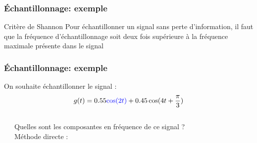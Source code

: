 \documentclass{beamer}
\begin{document}
\begin{frame} 
\frametitle{\'Echantillonnage: exemple}
\begin{block}{Critère de Shannon}
Pour échantillonner un signal sans perte d'information, il faut que la fréquence d'échantillonnage soit deux fois supérieure à la fréquence maximale présente dans le signal
\end{block}


\end{frame}

\begin{frame}
\frametitle{\'Echantillonnage: exemple}
On souhaite échantillonner le signal : $$g(t) = 0.55{\color{blue}\cos(2 t)} + 0.45 \cos(4 t + \frac{\pi}{3}) $$
\begin{columns}[T]
\column{60 mm}
\begin{center}
\end{center}

\column{60 mm}

Quelles sont les composantes en fréquence de ce signal ?\\
\vspace{0.3cm}
Méthode directe :\\
\vspace{0.3cm}

\end{columns}
\end{frame}
\end{document}
